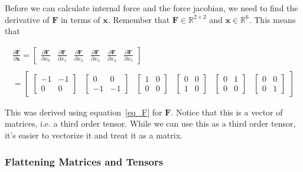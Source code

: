 \documentclass[twocolumn,10pt]{asme2ej}
\begin{document}
Before we can calculate internal force and the force jacobian, we need to find the derivative of $\bm{F}$ in terms of $\bm{x}$. Remember that $\bm{F} \in \mathbb{R}^{2 \times 2}$ and $\bm{x} \in \mathbb{R}^6$. This means that

\begin{equation}
  \begin{split}
    \frac{\partial \bm{F}}{\partial \bm{x}} = \begin{bmatrix} \frac{\partial \bm{F}}{\partial x_0} & \frac{\partial \bm{F}}{\partial x_1}
    & \frac{\partial \bm{F}}{\partial x_2} & \frac{\partial \bm{F}}{\partial x_3} & \frac{\partial \bm{F}}{\partial x_4}
    & \frac{\partial \bm{F}}{\partial x_5} \end{bmatrix} \\ \\
    = \begin{bmatrix} \begin{bmatrix} -1 & -1 \\ 0 & 0 \end{bmatrix} & \begin{bmatrix} 0 & 0 \\ -1 & -1 \end{bmatrix}
  & \begin{bmatrix} 1 & 0 \\ 0 & 0 \end{bmatrix} & \begin{bmatrix} 0 & 0 \\ 1 & 0 \end{bmatrix}
  & \begin{bmatrix} 0 & 1 \\ 0 & 0 \end{bmatrix} & \begin{bmatrix} 0 & 0 \\ 0 & 1 \end{bmatrix}\end{bmatrix}
  \end{split}
\label{eq_dFdx}
\end{equation}

This was derived using equation~\ref{eq_F} for $\bm{F}$. Notice that this is a vector of matrices, i.e. a third order tensor. While we can use this as a third order tensor, it's easier to vectorize it and treat it as a matrix.

\subsubsection{Flattening Matrices and Tensors}
\end{document}
